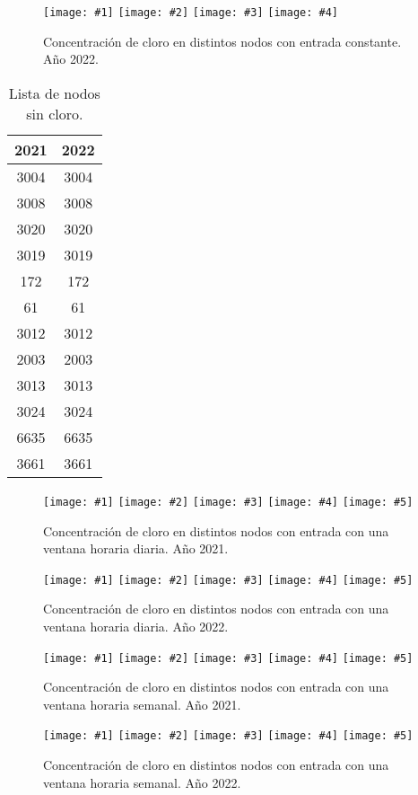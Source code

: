 \documentclass[a4paper]{article}
\newcommand{\FIGIV}[6]
{
	\begin{figure}[ht!]
		\centering
		\texttt{[image: \#1]}
		\texttt{[image: \#2]}
		\texttt{[image: \#3]}
		\texttt{[image: \#4]}
		\caption{#5.\label{#6}}
	\end{figure}
}
\newcommand{\FIGV}[7]
{
	\begin{figure}[ht!]
		\centering
		\texttt{[image: \#1]}
		\texttt{[image: \#2]}
		\texttt{[image: \#3]}
		\texttt{[image: \#4]}
		\texttt{[image: \#5]}
		\caption{#6.\label{#7}}
	\end{figure}
}
\begin{document}
\FIGIV{24-0.36-2022-chlorine-constant-0.eps}{24-0.36-2022-chlorine-constant-2.eps}
{24-0.36-2022-chlorine-constant-68.eps}{24-0.36-2022-chlorine-constant-172.eps}
{Concentración de cloro en distintos nodos con entrada constante. Año 2022}
{Fig0362022ChlorineConstant}

\begin{table}[ht!]
	\centering
	\caption{Lista de nodos sin cloro.\label{TabWithoutChlorine}}
	\begin{tabular}{cc}
		2021 & 2022 \\
		\hline
                3004 & 3004 \\
		3008 & 3008 \\
		3020 & 3020 \\
		3019 & 3019 \\
		172 & 172 \\
		61 & 61 \\
		3012 & 3012 \\
		2003 & 2003 \\
		3013 & 3013 \\
		3024 & 3024 \\
		6635 & 6635 \\
		3661 & 3661
	\end{tabular}	
\end{table}

\FIGV{24-0.36-2021-chlorine-day-0.eps}{24-0.36-2021-chlorine-day-2.eps}
{24-0.36-2021-chlorine-day-65.eps}{24-0.36-2021-chlorine-day-6665.eps}
{24-0.36-2021-chlorine-day-172.eps}
{Concentración de cloro en distintos nodos con entrada con una ventana horaria
diaria. Año 2021}{Fig0362021ChlorineDay}

\FIGV{24-0.36-2022-chlorine-day-0.eps}{24-0.36-2022-chlorine-day-2.eps}
{24-0.36-2022-chlorine-day-6634.eps}{24-0.36-2022-chlorine-day-68.eps}
{24-0.36-2022-chlorine-day-172.eps}
{Concentración de cloro en distintos nodos con entrada con una ventana horaria
diaria. Año 2022}{Fig0362022ChlorineDay}

\FIGV{24-0.36-2021-chlorine-week-0.eps}{24-0.36-2021-chlorine-week-2.eps}
{24-0.36-2021-chlorine-week-68.eps}{24-0.36-2021-chlorine-week-123.eps}
{24-0.36-2021-chlorine-week-172.eps}
{Concentración de cloro en distintos nodos con entrada con una ventana horaria
semanal. Año 2021}{Fig0362021ChlorineWeek}

\FIGV{24-0.36-2022-chlorine-week-0.eps}{24-0.36-2022-chlorine-week-2.eps}
{24-0.36-2022-chlorine-week-6634.eps}{24-0.36-2022-chlorine-week-139.eps}
{24-0.36-2022-chlorine-week-172.eps}
{Concentración de cloro en distintos nodos con entrada con una ventana horaria
semanal. Año 2022}{Fig0362022ChlorineWeek}
\end{document}
